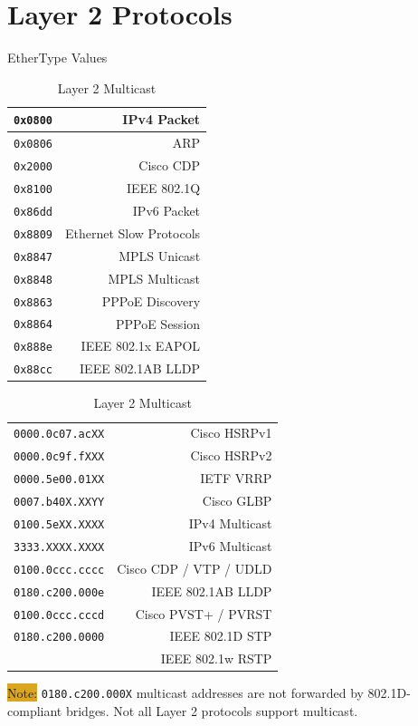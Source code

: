 \documentclass[12pt]{article}
\newcommand{\note}[1]{\colorbox{#1}{Note:}}
\begin{document}
\section{Layer 2 Protocols \label{sec:L2}}
	\begin{table}[H]
	\begin{minipage}{.4\linewidth}
	\centering
	\caption{EtherType Values \label{tab:ETHERTYPE}}
	\begin{tabular}{| c | r |}
	\hline
	\texttt{0x0800}	& IPv4 Packet\\\hline
	\texttt{0x0806}	& ARP\\\hline
	\texttt{0x2000}	& Cisco CDP\\\hline
	\texttt{0x8100}	& IEEE 802.1Q\\\hline
	\texttt{0x86dd}	& IPv6 Packet\\\hline
	\texttt{0x8809}	& Ethernet Slow Protocols\\\hline
	\texttt{0x8847}	& MPLS Unicast\\
	\texttt{0x8848}	& MPLS Multicast\\\hline
	\texttt{0x8863}	& PPPoE Discovery\\
	\texttt{0x8864}	& PPPoE Session\\\hline
	\texttt{0x888e}	& IEEE 802.1x EAPOL\\\hline
	\texttt{0x88cc}	& IEEE 802.1AB LLDP\\\hline
	\end{tabular}\end{minipage}\hfill
	\begin{minipage}{.6\linewidth}
	\centering
	\caption{Layer 2 Multicast \label{tab:MULTICAST L2}}
	\begin{tabular}{| l | r |}
	\hline
	\texttt{0000.0c07.acXX}		& Cisco HSRPv1\\
	\texttt{0000.0c9f.fXXX}		& Cisco HSRPv2\\\hline
	\texttt{0000.5e00.01XX} 		& IETF VRRP\\\hline
	\texttt{0007.b40X.XXYY}		& Cisco GLBP\\\hline
	\texttt{0100.5eXX.XXXX}		& IPv4 Multicast\\
	\texttt{3333.XXXX.XXXX}		& IPv6 Multicast\\\hline
	\texttt{0100.0ccc.cccc}	 	& Cisco CDP / VTP / UDLD\\\hline
	\texttt{0180.c200.000e}	 	& IEEE 802.1AB LLDP\\\hline
	\texttt{0100.0ccc.cccd}		& Cisco PVST+ / PVRST\\\hline
	\texttt{0180.c200.0000}	 	& IEEE 802.1D STP\\
						& IEEE 802.1w RSTP\\\hline
	\end{tabular}\end{minipage}\end{table}
	\note{Goldenrod} \texttt{0180.c200.000X} multicast addresses are not forwarded by 802.1D-compliant bridges. Not all Layer 2 protocols support multicast.
\end{document}

